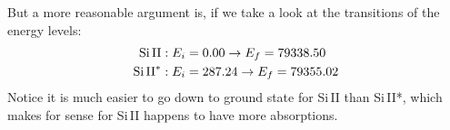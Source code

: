 \documentclass[12pt,letterpaper]{article}
\newcommand{\siii}{\textrm{Si\,II}}
\begin{document}
But a more reasonable argument is, if we take a look at the transitions of the energy levels:
\begin{equation*}
    \begin{split}
        {\siii}: E_i &= 0.00 \rightarrow E_{f} = 79338.50\\
        {\siii}^*: E_i &= 287.24 \rightarrow E_{f} = 79355.02
    \end{split}
\end{equation*}
Notice it is much easier to go down to ground state for {\siii} than {\siii}*, which makes for sense for {\siii} happens to have more absorptions. 
\end{document}

